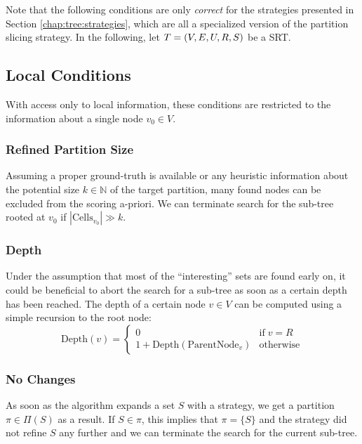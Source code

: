 		Note that the following conditions are only \textit{correct} for the strategies presented in Section \ref{chap:tree:strategies}, which are all a specialized version of the partition slicing strategy.
		In the following, let $T = (V, E, U, R, S)$ be a \ac{SRT}.
		
		\subsection{Local Conditions}
		
			With access only to local information, these conditions are restricted to the information about a single node $v_0 \in V$.
			
			\subsubsection{Refined Partition Size}
			
			Assuming a proper ground-truth is available or any heuristic information about the potential size $k \in \mathbb{N}$ of the target partition, many found nodes can be excluded from the scoring a-priori. 
			We can terminate search for the sub-tree rooted at $v_0$ if $| \mathrm{Cells}_{v_0} | \gg k$.
			
			\subsubsection{Depth}
			
			Under the assumption that most of the \enquote{interesting} sets are found early on, it could be beneficial to abort the search for a sub-tree as soon as a certain depth has been reached.
			The depth of a certain node $v \in V$ can be computed using a simple recursion to the root node:
			\begin{equation*}
				\mathrm{Depth}(v) = \begin{cases}
					0 & \text{if} \; v = R \\
					1 + \mathrm{Depth}(\mathrm{ParentNode}_v) & \mathrm{otherwise}
				\end{cases}
			\end{equation*}
			
			\subsubsection{No Changes}
			
			As soon as the algorithm expands a set $S$ with a strategy, we get a partition $\pi \in \Pi(S)$ as a result.
			If $S \in \pi$, this implies that $\pi = \{ S \}$ and the strategy did not refine $S$ any further and we can terminate the search for the current sub-tree.
			
